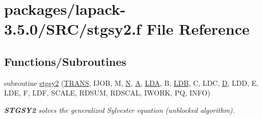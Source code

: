 \hypertarget{stgsy2_8f}{}\section{packages/lapack-\/3.5.0/\+S\+R\+C/stgsy2.f File Reference}
\label{stgsy2_8f}
\subsection*{Functions/\+Subroutines}
\begin{DoxyCompactItemize}
\item 
subroutine \hyperlink{group__realSYauxiliary_ga739f7e0603f9635371aad0683dae1dbb}{stgsy2} (\hyperlink{superlu__enum__consts_8h_a0c4e17b2d5cea33f9991ccc6a6678d62a1f61e3015bfe0f0c2c3fda4c5a0cdf58}{T\+R\+A\+N\+S}, I\+J\+O\+B, M, \hyperlink{polmisc_8c_a0240ac851181b84ac374872dc5434ee4}{N}, \hyperlink{classA}{A}, \hyperlink{example__user_8c_ae946da542ce0db94dced19b2ecefd1aa}{L\+D\+A}, B, \hyperlink{example__user_8c_a50e90a7104df172b5a89a06c47fcca04}{L\+D\+B}, C, L\+D\+C, \hyperlink{odrpack_8h_a7dae6ea403d00f3687f24a874e67d139}{D}, L\+D\+D, E, L\+D\+E, F, L\+D\+F, S\+C\+A\+L\+E, R\+D\+S\+U\+M, R\+D\+S\+C\+A\+L, I\+W\+O\+R\+K, P\+Q, I\+N\+F\+O)
\begin{DoxyCompactList}\small\item\em {\bfseries S\+T\+G\+S\+Y2} solves the generalized Sylvester equation (unblocked algorithm). \end{DoxyCompactList}\end{DoxyCompactItemize}
